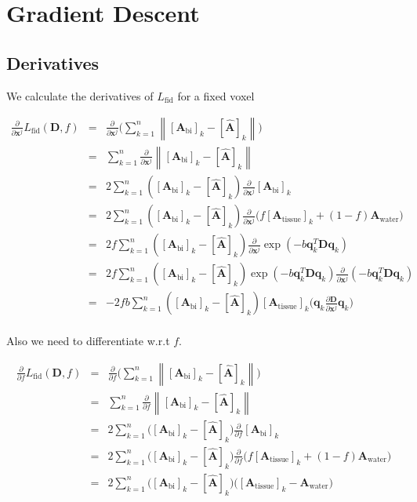 \documentclass[12pt]{article}
\newcommand{\vect}[1]{\mathbf{#1}}
\newcommand{\Ahat}{\hat{\vect{A}}}
\newcommand{\Atissue}{\vect{A}_{\text{tissue}}}
\newcommand{\Awater}{\vect{A}_{\text{water}}}
\newcommand{\Abi}{\vect{A}_{\text{bi}}}
\newcommand{\vx}{\vect{x}}
\newcommand{\vD}{\vect{D}}
\newcommand{\vqk}{\vect{q}_k}
\newcommand{\pp}[1]{\frac{\partial}{\partial #1}}
\newcommand{\ppfull}[2]{\frac{\partial #2}{\partial #1}}
\begin{document}
\section{Gradient Descent}

\subsection{Derivatives}
We calculate the derivatives of $L_\text{fid}$ for a fixed voxel

\begin{eqnarray*}
\pp{\vx^j}L_\text{fid}(\vect{D}, f) &=& 
\pp{\vx^j} \bigg( \sum_{k=1}^n
        \left\lVert[\Abi]_k - 
[\Ahat]_k \right\rVert \bigg) 
    \\
&=&  \sum_{k=1}^n \pp{\vx^j}
        \left\lVert[\Abi]_k - 
[\Ahat]_k \right\rVert  
    \\
&=& 2 \sum_{k=1}^n \left( [\Abi]_k - [\Ahat]_k \right) 
\pp{\vx^j} [\Abi]_k 
    \\
&=& 2 \sum_{k=1}^n \left( [\Abi]_k - [\Ahat]_k \right) 
\pp{\vx^j} \big( f [\Atissue]_k + (1-f)\Awater \big)  
     \\
&=& 2 f \sum_{k=1}^n \left( [\Abi]_k - [\Ahat]_k \right) 
        \pp{\vx^j}  \exp(-b \vqk^T\vD\vqk)  
     \\
&=& 2 f \sum_{k=1}^n \left( [\Abi]_k - [\Ahat]_k \right) 
        \exp(-b \vqk^T\vD\vqk)  \pp{\vx^j} (-b \vqk^T\vD\vqk)
     \\
&=& -2 f b\sum_{k=1}^n \left( [\Abi]_k - [\Ahat]_k \right) 
        [\Atissue]_k \bigg(\vqk \ppfull{\vx^j}{\vD} \vqk \bigg)
     \\
 \end{eqnarray*}

\noindent
Also we need to differentiate w.r.t $f$. 

\begin{eqnarray*}
\pp{f}L_\text{fid}(\vect{D}, f) &=& \pp{f} \bigg( \sum_{k=1}^n
   \left\lVert[\Abi]_k - [\Ahat]_k \right\rVert \bigg) 
    \\
&=& \sum_{k=1}^n \pp{f}
   \left\lVert[\Abi]_k - [\Ahat]_k \right\rVert 
    \\
&=& 2 \sum_{k=1}^n \big([\Abi]_k - [\Ahat]_k \big) \pp{f} [\Abi]_k 
    \\
&=& 2 \sum_{k=1}^n \big([\Abi]_k - [\Ahat]_k \big) 
        \pp{f} \big(f[\Atissue]_k + (1-f) \Awater \big)
    \\
&=& 2 \sum_{k=1}^n \big([\Abi]_k - [\Ahat]_k \big) 
        \big([\Atissue]_k - \Awater \big)
    \\
\end{eqnarray*}
\end{document}
